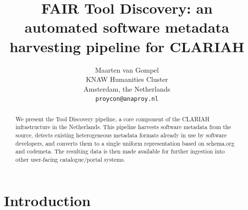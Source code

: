 \documentclass[a4paper,11pt]{article}
\title{FAIR Tool Discovery: an automated software metadata harvesting pipeline for CLARIAH}
\author{Maarten van Gompel \\
  KNAW Humanities Cluster \\
  Amsterdam, the Netherlands \\
  {\tt proycon@anaproy.nl} %
}
\date{}
\begin{document}
\maketitle
\begin{abstract}
  We present the Tool Discovery pipeline, a core component of the CLARIAH
    infrastructure in the Netherlands. This pipeline harvests software metadata
    from the source, detects existing heterogeneous metadata formats already in
    use by software developers, and converts them to a single uniform representation
    based on schema.org and codemeta. The resulting data is then made available
    for further ingestion into other user-facing catalogue/portal systems. 
\end{abstract}

\section{Introduction} \label{intro}

%

\end{document}
